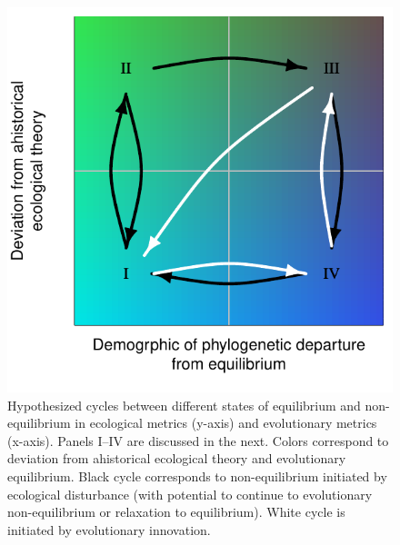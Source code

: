 \documentclass[12pt]{article}
\begin{document}
\begin{figure}[!ht]
  \centering
  \includegraphics[scale=1]{fig_cycles.pdf}
  \caption{Hypothesized cycles between different states of equilibrium
    and non-equilibrium in ecological metrics (y-axis) and
    evolutionary metrics (x-axis). Panels I--IV are discussed in the
    next.  Colors correspond to deviation from ahistorical ecological
    theory and evolutionary equilibrium.  Black cycle corresponds to
    non-equilibrium initiated by ecological disturbance (with
    potential to continue to evolutionary non-equilibrium or
    relaxation to equilibrium). White cycle is initiated by
    evolutionary innovation.}
  \label{fig:cycles}
\end{figure}
\end{document}
